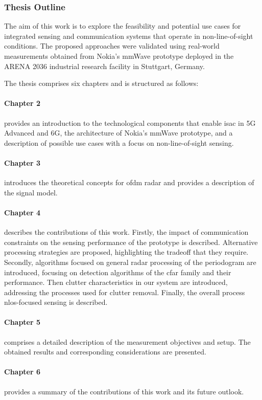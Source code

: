 \subsubsection{Thesis Outline}

The aim of this work is to explore the feasibility and potential use cases for integrated sensing and communication systems that operate in non-line-of-sight conditions.
The proposed approaches were validated using real-world measurements obtained from Nokia's mmWave prototype deployed in the ARENA 2036 industrial research facility in Stuttgart, Germany.

The thesis comprises six chapters and is structured as follows:

\paragraph{Chapter 2} provides an introduction to the technological components that enable \gls{isac} in \gls{5G} Advanced and 6G, the architecture of Nokia's mmWave prototype, and a description of possible use cases with a focus on non-line-of-sight sensing.

\paragraph{Chapter 3} introduces the theoretical concepts for \gls{ofdm} radar and provides a description of the signal model.

\paragraph{Chapter 4} describes the contributions of this work. Firstly, the impact of communication constraints on the sensing performance of the prototype is described. Alternative processing strategies are proposed, highlighting the tradeoff that they require.
Secondly, algorithms focused on general radar processing of the periodogram are introduced, focusing on detection algorithms of the \gls{cfar} family and their performance.
Then clutter characteristics in our system are introduced, addressing the processes used for clutter removal.
Finally, the overall process \gls{nlos}-focused sensing is described.

\paragraph{Chapter 5} comprises a detailed description of the measurement objectives and setup. The obtained results and corresponding considerations are presented.

\paragraph{Chapter 6} provides a summary of the contributions of this work and its future outlook.
